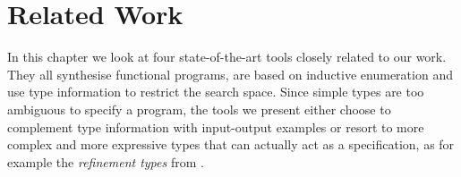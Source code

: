 \lstset{style=plain}

\chapter{Related Work} \label{ch:relatedwork}

In this chapter we look at four state-of-the-art tools closely related to our work. They all synthesise functional programs, are based on inductive enumeration and use type information to restrict the search space. Since simple types are too ambiguous to specify a program, the tools we present either choose to complement type information with input-output examples or resort to more complex and more expressive types that can actually act as a specification, as for example the \emph{refinement types} from \cite{SynquidPaper}.

